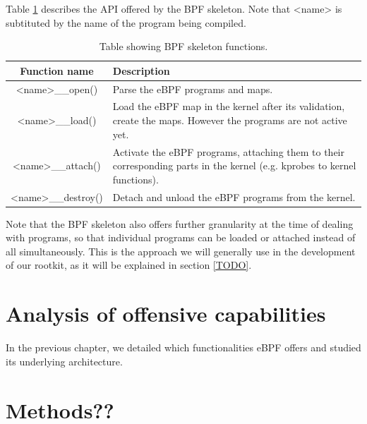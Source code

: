 \documentclass[12pt]{report} %
\begin{document}
Table \ref{table:libbpf_skel} describes the API offered by the BPF skeleton. Note that <name> is subtituted by the name of the program being compiled.

\begin{table}[H]
\begin{tabular}{|c|>{\centering\arraybackslash}p{10cm}|}
\hline
Function name & Description\\
\hline
\hline
<name>\_\_open() & Parse the eBPF programs and maps.\\
\hline
<name>\_\_load() & Load the eBPF map in the kernel after its validation, create the maps. However the programs are not active yet.\\
\hline
<name>\_\_attach() & Activate the eBPF programs, attaching them to their corresponding parts in the kernel (e.g. kprobes to kernel functions).\\
\hline
<name>\_\_destroy() & Detach and unload the eBPF programs from the kernel.\\
\hline
\end{tabular}
\caption{Table showing BPF skeleton functions.}
\label{table:libbpf_skel}
\end{table}

Note that the BPF skeleton also offers further granularity at the time of dealing with programs, so that individual programs can be loaded or attached instead of all simultaneously. This is the approach we will generally use in the development of our rootkit, as it will be explained in section \ref{TODO}.







\chapter{Analysis of offensive capabilities}
In the previous chapter, we detailed which functionalities eBPF offers and studied its underlying architecture. 





\chapter{Methods??}
\end{document}
